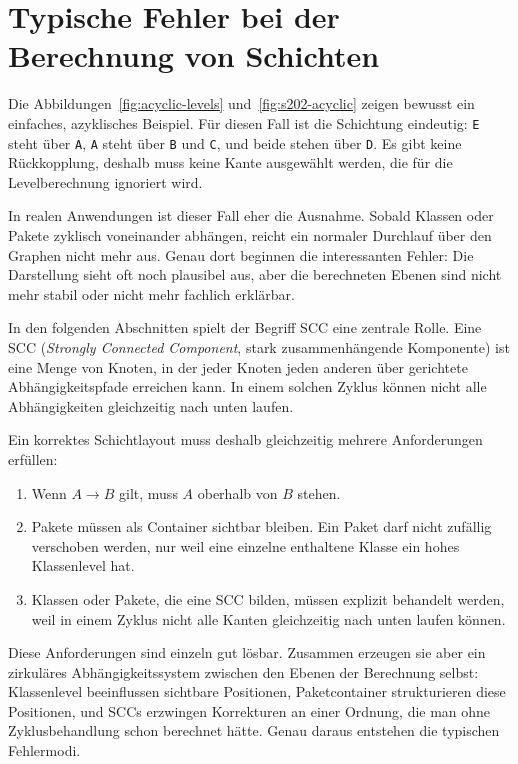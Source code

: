 \documentclass[a4paper,11pt]{article}
\begin{document}
\section{Typische Fehler bei der Berechnung von Schichten}

Die Abbildungen~\ref{fig:acyclic-levels} und~\ref{fig:s202-acyclic} zeigen
bewusst ein einfaches, azyklisches Beispiel. F\"ur diesen Fall ist die
Schichtung eindeutig: \texttt{E} steht \"uber \texttt{A}, \texttt{A} steht
\"uber \texttt{B} und \texttt{C}, und beide stehen \"uber \texttt{D}. Es gibt
keine R\"uckkopplung, deshalb muss keine Kante ausgew\"ahlt werden, die f\"ur
die Levelberechnung ignoriert wird.

In realen Anwendungen ist dieser Fall eher die Ausnahme. Sobald Klassen oder
Pakete zyklisch voneinander abh\"angen, reicht ein normaler Durchlauf \"uber
den Graphen nicht mehr aus. Genau dort beginnen die interessanten Fehler: Die
Darstellung sieht oft noch plausibel aus, aber die berechneten Ebenen sind
nicht mehr stabil oder nicht mehr fachlich erkl\"arbar.

In den folgenden Abschnitten spielt der Begriff SCC eine zentrale Rolle. Eine
SCC (\emph{Strongly Connected Component}, stark zusammenh\"angende Komponente)
ist eine Menge von Knoten, in der jeder Knoten jeden anderen
\"uber gerichtete Abh\"angigkeitspfade erreichen kann. In einem solchen Zyklus
k\"onnen nicht alle Abh\"angigkeiten gleichzeitig nach unten laufen.

Ein korrektes Schichtlayout muss deshalb gleichzeitig mehrere Anforderungen
erf\"ullen:

\begin{enumerate}
  \item Wenn $A \to B$ gilt, muss $A$ oberhalb von $B$ stehen.
  \item Pakete m\"ussen als Container sichtbar bleiben. Ein Paket darf nicht
        zuf\"allig verschoben werden, nur weil eine einzelne enthaltene Klasse
        ein hohes Klassenlevel hat.
  \item Klassen oder Pakete, die eine SCC bilden, m\"ussen explizit behandelt
        werden, weil in einem Zyklus nicht alle Kanten gleichzeitig nach unten
        laufen k\"onnen.
\end{enumerate}

Diese Anforderungen sind einzeln gut l\"osbar. Zusammen erzeugen sie aber ein
zirkul\"ares Abh\"angigkeitssystem zwischen den Ebenen der Berechnung selbst:
Klassenlevel beeinflussen sichtbare Positionen, Paketcontainer strukturieren
diese Positionen, und SCCs erzwingen Korrekturen an einer Ordnung, die man
ohne Zyklusbehandlung schon berechnet h\"atte. Genau daraus entstehen die
typischen Fehlermodi.
\end{document}
